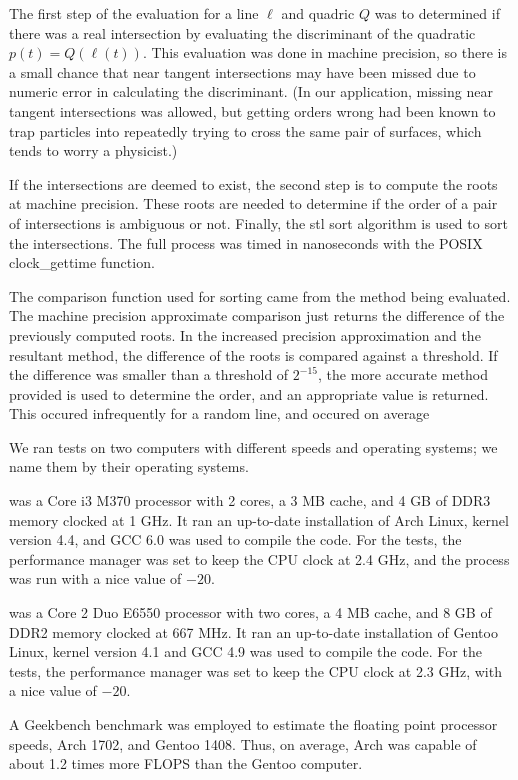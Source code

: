 \documentclass{cccg16}
\begin{document}
The first step of the evaluation for a line $\ell$ and quadric $Q$ was
to determined if there was a real intersection by evaluating the
discriminant of the quadratic~$p(t)=Q(\ell(t))$.  This evaluation was
done in machine precision, so there is a small chance that near
tangent intersections may have been missed due to numeric error in
calculating the discriminant. (In our application, missing near
tangent intersections was allowed, but getting orders wrong had been
known to trap particles into repeatedly trying to cross the same pair
of surfaces, which tends to worry a physicist.)

If the intersections are deemed to exist, the second step is to
compute the roots at machine precision.  These roots are needed to
determine if the order of a pair of intersections is ambiguous or not.
Finally, the stl sort algorithm is used to sort the intersections.
The full process was timed in nanoseconds with the POSIX
clock\_gettime function.

The comparison function used for sorting came from the method being
evaluated.  The machine precision approximate comparison just returns
the difference of the previously computed roots.  In the increased
precision approximation and the resultant method, the difference of
the roots is compared against a threshold.  If the difference was
smaller than a threshold of $2^{-15}$, the more accurate method
provided is used to determine the order, and an appropriate value is
returned.  This occured infrequently for a random line, and occured on
average


We ran tests on two computers with different speeds and operating
systems; we name them by their operating systems.

 was a Core i3 M370 processor with 2 cores, a 3 MB
cache, and 4 GB of DDR3 memory clocked at 1 GHz.  It ran an up-to-date
installation of Arch Linux, kernel version 4.4, and GCC 6.0 was used
to compile the code.  For the tests, the performance manager was set
to keep the CPU clock at 2.4 GHz, and the process was run with a nice
value of $-20$.

 was a Core 2 Duo E6550 processor with two cores,
a 4 MB cache, and 8 GB of DDR2 memory clocked at 667 MHz.  It ran an
up-to-date installation of Gentoo Linux, kernel version 4.1 and GCC
4.9 was used to compile the code.  For the tests, the performance
manager was set to keep the CPU clock at 2.3 GHz, with a nice value of
$-20$.

A Geekbench benchmark was employed to estimate the floating point
processor speeds, Arch 1702, and Gentoo 1408. Thus, on average, Arch
was capable of about 1.2 times more FLOPS than the Gentoo computer.
\end{document}
